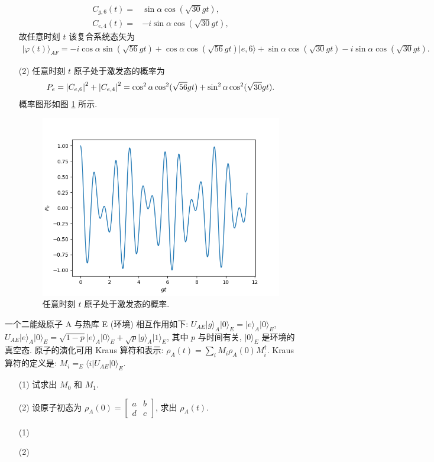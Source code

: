\documentclass{assignment}
\begin{document}
\begin{sol}
\begin{itemize}
\begin{align}
            C_{g,6}(t)=&\sin\alpha\cos(\sqrt{30}gt),\\
            C_{e,4}(t)=&-i\sin\alpha\cos(\sqrt{30}gt),
        \end{align}
        故任意时刻 $t$ 该复合系统态矢为
        \begin{align}
            \lvert\varphi(t)\rangle_{AF}=-i\cos\alpha\sin(\sqrt{56}gt)+\cos\alpha\cos(\sqrt{56}gt)\lvert e,6\rangle+\sin\alpha\cos(\sqrt{30}gt)-i\sin\alpha\cos(\sqrt{30}gt).
        \end{align}
        \item[(2)] 任意时刻 $t$ 原子处于激发态的概率为
        \begin{align}
            P_e=\left\lvert C_{e,6}\right\rvert^2+\left\lvert C_{e,4}\right\rvert^2=\cos^2\alpha\cos^2(\sqrt{56}gt)+\sin^2\alpha\cos^2(\sqrt{30}gt).
        \end{align}
        概率图形如图 \ref{2014-5} 所示.
        \begin{figure}[H]
            \centering
            \includegraphics[width=.5\columnwidth]{Figures/2014-5.png}
            \caption{任意时刻 $t$ 原子处于激发态的概率.}
            \label{2014-5}
        \end{figure}
    \end{itemize}
\end{sol}

\begin{prob}
    一个二能级原子 A 与热库 E (环境) 相互作用如下: $U_{AE}\lvert g\rangle_A\lvert 0\rangle_E=\lvert e\rangle_A\lvert 0\rangle_E$, $U_{AE}\lvert e\rangle_A\lvert 0\rangle_E=\sqrt{1-p}\lvert e\rangle_A\lvert 0\rangle_E+\sqrt{p}\lvert g\rangle_A\lvert 1\rangle_E$, 其中 $p$ 与时间有关, $\lvert 0\rangle_E$ 是环境的真空态. 原子的演化可用 Kraus 算符和表示: $\rho_A(t)=\sum_iM_i\rho_A(0)M_i^{\dagger}$. Kraus 算符的定义是: $M_i=_E\langle i\rvert U_{AE}\lvert 0\rangle_E$.
    \begin{itemize}
        \item[(1)] 试求出 $M_0$ 和 $M_1$.
        \item[(2)] 设原子初态为 $\rho_A(0)=\begin{bmatrix}
            a&b\\
            d&c
        \end{bmatrix}$, 求出 $\rho_A(t)$.
    \end{itemize}
\end{prob}
\begin{sol}
    \begin{itemize}
        \item[(1)] 
        \item[(2)] 
    \end{itemize}
\end{sol}
\end{document}
